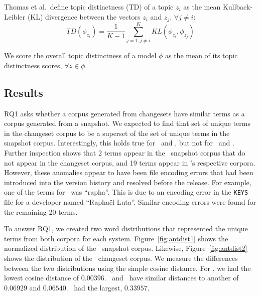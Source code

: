 \newpage
Thomas et al.\ define topic distinctness (TD) of a topic $z_i$ as the mean
Kullback-Leibler (KL) divergence between the vectors $z_i$ and $z_j$, $\forall j \neq i$:
\begin{equation}
TD(\phi_{z_i}) =
\frac{1}{K - 1}
\sum_{j=1,j \neq i}^{K}
KL(\phi_{z_i}, \phi_{z_j})
\label{eq:topicdistinctness}
\end{equation}

We score the overall topic distinctness of a model $\phi$ as the mean of
its topic distinctness scores, $\forall z \in \phi$.

\subsection{Results}


RQ1 asks whether a corpus generated from changesets have similar terms
as a corpus generated from a snapshot.
We expected to find that set of unique terms in the changeset corpus to be
a superset of the set of unique terms in the snapshot corpus.
Interestingly, this holds true for \jodatime\ and \aspectj,
but not for \ant\ and \postgres.
Further inspection shows that 2 terms appear in the \ant\ snapshot corpus that do not appear in the changeset corpus,
and 19 terms appear in \postgres's respective corpora.
However, these anomalies appear to have been file encoding errors that
had been introduced into the version history and resolved before the release.
For example, one of the terms for \ant\ was ``rapha''. This is due
to an encoding error in the \texttt{KEYS} file for a developer named
``Rapha\"{e}l Luta''.
Similar encoding errors were found for the remaining 20 terms.

To answer RQ1, we created two word distributions that represented the unique
terms from both corpora for each system.
Figure~\ref{fig:antdist1} shows the normalized distribution of the \ant\ snapshot corpus.
Likewise, Figure~\ref{fig:antdist2} shows the distribution of the \ant\ changeset corpus.
We measure the differences between the two distributions using the simple
cosine distance. For \ant, we had the lowest cosine distance of $0.00396$.
\aspectj\ and \jodatime\ have similar distances to another of $0.06929$ and
$0.06540$. \postgres\ had the largest, $0.33957$.

